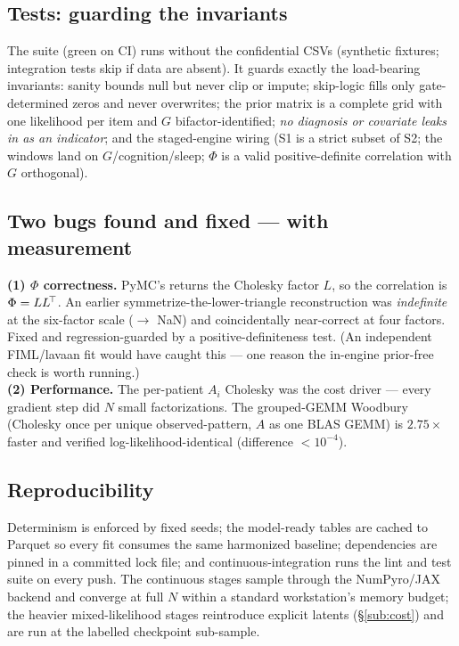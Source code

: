 \subsection{Tests: guarding the invariants}
The suite (green on CI) runs without the confidential CSVs (synthetic fixtures; integration tests
skip if data are absent). It guards exactly the load-bearing invariants: sanity bounds null but never clip or
impute;
skip-logic fills only gate-determined zeros and never overwrites; the prior matrix is a complete grid with one
likelihood per item and $G$ bifactor-identified; \emph{no diagnosis or covariate leaks in as an indicator}; and
the staged-engine wiring (S1 is a strict subset of S2; the windows land on $G$/cognition/sleep; $\Phi$ is a
valid positive-definite correlation with $G$ orthogonal).

\subsection{Two bugs found and fixed --- with measurement}
\begin{methodsbox}
\textbf{(1) $\Phi$ correctness.} PyMC's  returns the Cholesky factor $L$, so the correlation is
$\Phi=LL^{\!\top}$. An earlier symmetrize-the-lower-triangle reconstruction was \emph{indefinite} at the six-factor
scale ($\to$ NaN) and coincidentally near-correct at four factors. Fixed and regression-guarded by a
positive-definiteness test. (An independent FIML/lavaan fit would have caught this --- one reason the
in-engine prior-free check is worth running.)\\[3pt]
\textbf{(2) Performance.} The per-patient $A_i$ Cholesky was the cost driver --- every gradient step did $N$
small factorizations. The grouped-GEMM Woodbury (Cholesky once per unique observed-pattern, $A$ as one BLAS
GEMM) is $2.75\times$ faster and verified log-likelihood-identical (difference $<10^{-4}$).
\end{methodsbox}

\subsection{Reproducibility}
Determinism is enforced by fixed seeds; the model-ready tables are cached to Parquet so every fit consumes the
same harmonized baseline; dependencies are pinned in a committed lock file; and continuous-integration runs the
lint and test suite on every push. The continuous stages sample through the NumPyro/JAX backend and converge at
full $N$ within a standard workstation's memory budget; the heavier mixed-likelihood stages reintroduce explicit
latents (\S\ref{sub:cost}) and are run at the labelled checkpoint sub-sample.
